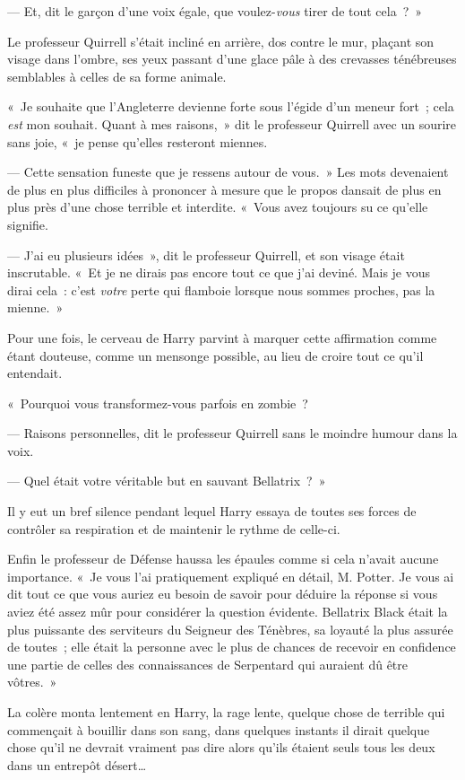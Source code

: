 --- Et, dit le garçon d'une voix égale, que voulez-\emph{vous} tirer de tout cela~?~»

Le professeur Quirrell s'était incliné en arrière, dos contre le mur, plaçant son visage dans l'ombre, ses yeux passant d'une glace pâle à des crevasses ténébreuses semblables à celles de sa forme animale.

«~Je souhaite que l'Angleterre devienne forte sous l'égide d'un meneur fort~; cela \emph{est} mon souhait. Quant à mes raisons,~» dit le professeur Quirrell avec un sourire sans joie, «~je pense qu'elles resteront miennes.

--- Cette sensation funeste que je ressens autour de vous.~» Les mots devenaient de plus en plus difficiles à prononcer à mesure que le propos dansait de plus en plus près d'une chose terrible et interdite. «~Vous avez toujours su ce qu'elle signifie.

--- J'ai eu plusieurs idées~», dit le professeur Quirrell, et son visage était inscrutable. «~Et je ne dirais pas encore tout ce que j'ai deviné. Mais je vous dirai cela~: c'est \emph{votre} perte qui flamboie lorsque nous sommes proches, pas la mienne.~»

Pour une fois, le cerveau de Harry parvint à marquer cette affirmation comme étant douteuse, comme un mensonge possible, au lieu de croire tout ce qu'il entendait.

«~Pourquoi vous transformez-vous parfois en zombie~?

--- Raisons personnelles, dit le professeur Quirrell sans le moindre humour dans la voix.

--- Quel était votre véritable but en sauvant Bellatrix~?~»

Il y eut un bref silence pendant lequel Harry essaya de toutes ses forces de contrôler sa respiration et de maintenir le rythme de celle-ci.

Enfin le professeur de Défense haussa les épaules comme si cela n'avait aucune importance. «~Je vous l'ai pratiquement expliqué en détail, M. Potter. Je vous ai dit tout ce que vous auriez eu besoin de savoir pour déduire la réponse si vous aviez été assez mûr pour considérer la question évidente. Bellatrix Black était la plus puissante des serviteurs du Seigneur des Ténèbres, sa loyauté la plus assurée de toutes~; elle était la personne avec le plus de chances de recevoir en confidence une partie de celles des connaissances de Serpentard qui auraient dû être vôtres.~»

La colère monta lentement en Harry, la rage lente, quelque chose de terrible qui commençait à bouillir dans son sang, dans quelques instants il dirait quelque chose qu'il ne devrait vraiment pas dire alors qu'ils étaient seuls tous les deux dans un entrepôt désert…

